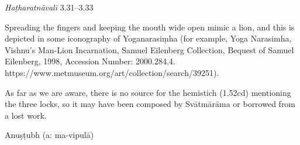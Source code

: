 \begin{ekdosis}
\begin{testimonia}[hp01_050]
\emph{Haṭharatnāvalī} 3.31–3.33

\begin{versinnote}
\end{versinnote}

\end{testimonia}

\begin{philcomm}[hp01_051]

Spreading the fingers and keeping the mouth wide open mimic a lion, and this is depicted in some iconography of Yoganarasiṃha (for example, Yoga Narasimha, Vishnu's Man-Lion Incarnation, Samuel Eilenberg Collection, Bequest of Samuel Eilenberg, 1998, Accession Number: 2000.284.4. https://www.metmuseum.org/art/collection/search/39251).  

As far as we are aware, there is no source for the hemistich (1.52cd) mentioning the three locks, so it may have been composed by Svātmārāma or borrowed from a lost work. 
\end{philcomm}

\begin{metre}[hp01_051]
Anuṣṭubh (a: ma-vipulā)
\end{metre}



\end{ekdosis}
